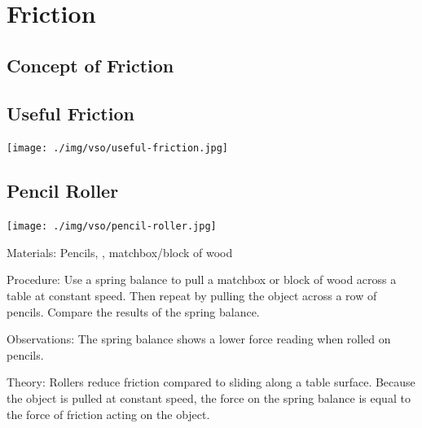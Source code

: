 \section{Friction}

\begin{multicols}{2}


\section*{Concept of Friction}


\subsection{Useful Friction}

\begin{center}
\texttt{[image: ./img/vso/useful-friction.jpg]}
\end{center}

\subsection{Pencil Roller}

\begin{center}
\texttt{[image: ./img/vso/pencil-roller.jpg]}
\end{center}

\begin{description*}
\item[Materials:]{Pencils, , matchbox/block of wood}
\item[Procedure:]{Use a spring balance to pull a matchbox or block of wood across a table at constant speed. Then repeat by pulling the object across a row of pencils. Compare the results of the spring balance.}
\item[Observations:]{The spring balance shows a lower force reading when rolled on pencils.}
\item[Theory:]{Rollers reduce friction compared to sliding along a table surface. Because the object is pulled at constant speed, the force on the spring balance is equal to the force of friction acting on the object.}
\end{description*}


\end{multicols}
